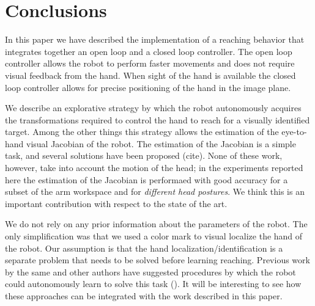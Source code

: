\section{Conclusions}
In this paper we have described the implementation of a reaching
behavior that integrates together an open loop and a closed 
loop controller. The open loop controller
allows the robot to perform faster movements and does not require visual 
feedback from the hand. When sight of the hand is available the closed
loop controller allows for precise positioning of the hand in the 
image plane. 

We describe an explorative strategy by which the robot autonomously 
acquires the transformations required to control the hand to reach for a
visually identified target. Among the other things this strategy 
allows the estimation of the eye-to-hand visual Jacobian of the robot. 
The estimation of the Jacobian is a simple task, and several solutions 
have been proposed (cite). None of these work, however, take into
account the motion of the head; in the experiments reported here the 
estimation of the Jacobian is performaed with good accuracy for a subset 
of the arm workspace and for \emph{different head postures}. We think
this is an important contribution with respect to the state of the art.

We do not rely on any prior information about the 
parameters of the robot. The only simplification was that we used 
a color mark to visual localize the hand of the robot. Our assumption
is that the hand localization/identification is a separate problem
that needs to be solved before learning reaching. Previous work
by the same and other authors have suggested procedures by which 
the robot could autonomously learn to solve this task 
(\cite{Natale05,edsinger06what}). It will be interesting to see
how these approaches can be integrated with the work described 
in this paper.
